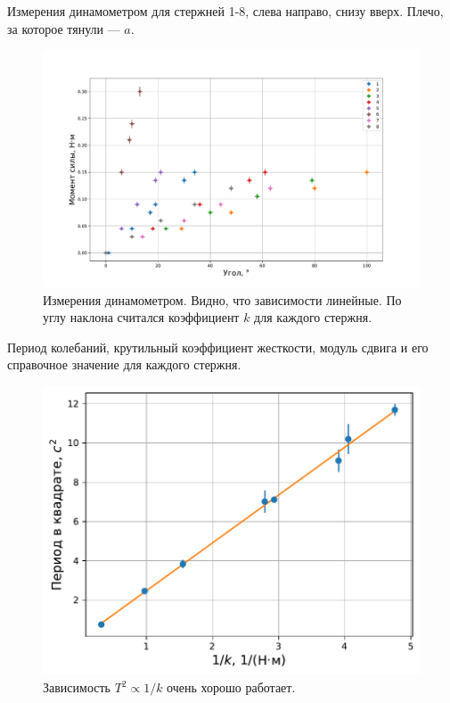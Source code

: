 \documentclass[a4paper, 12pt]{article}
\begin{document}
\begin{table}[!htbp]
\label{tab:force-angle}
\caption{
    Измерения динамометром для стержней 1-8, слева направо, снизу вверх.
    Плечо, за которое тянули --- $a$.
}








\end{table}

\begin{figure}[h]
\label{fig:torque-angle-plot}
\caption{
    Измерения динамометром. Видно, что зависимости линейные.
    По углу наклона считался коэффициент $k$ для каждого стержня.
}
\begin{center}
\includegraphics[width=1\linewidth]{torque-angle-plot.pdf}
\end{center}
\end{figure}

\begin{table}[!htbp]
\label{tab:main}
\caption{Период колебаний, крутильный коэффициент жесткости, модуль сдвига и его справочное значение для каждого стержня.}

\end{table}

\begin{figure}[h]
\caption{Зависимость $T^2 \propto 1/k$ очень хорошо работает.}
\begin{center}
\includegraphics[width=0.8\linewidth]{periods_vs_tors_coefs_plot.pdf}
\end{center}
\end{figure}
\end{document}
